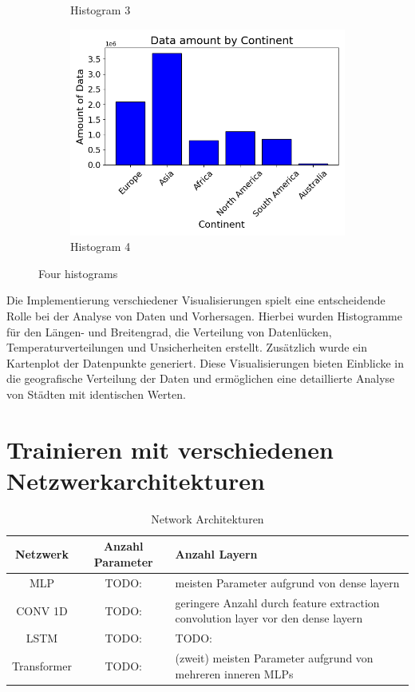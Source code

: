\documentclass[manuscript,screen,review]{acmart}
\begin{document}
\begin{figure}[htp]
\begin{subfigure}{.45\textwidth}
      \caption{Histogram 3}
      \label{fig:sub3}
  \end{subfigure}%
  \begin{subfigure}{.45\textwidth}
      \centering
      \includegraphics[width=.8\linewidth]{./histograms/Continents}
      \caption{Histogram 4}
      \label{fig:sub4}
  \end{subfigure}
  \caption{Four histograms}
  \label{fig:test}
\end{figure}

Die Implementierung verschiedener Visualisierungen spielt eine entscheidende Rolle bei der Analyse von Daten und Vorhersagen. 
Hierbei wurden Histogramme für den Längen- und Breitengrad, die Verteilung von Datenlücken, Temperaturverteilungen und Unsicherheiten erstellt. 
Zusätzlich wurde ein Kartenplot der Datenpunkte generiert. 
Diese Visualisierungen bieten Einblicke in die geografische Verteilung der Daten und ermöglichen eine detaillierte Analyse von Städten mit identischen Werten.


\section{Trainieren mit verschiedenen Netzwerkarchitekturen}

\begin{table}
  \caption{Network Architekturen}
  \label{tab:freq}
  \begin{tabular}{ccl}
    \toprule
    Netzwerk&Anzahl Parameter&Anzahl Layern\\
    \midrule
    MLP & TODO: & meisten Parameter aufgrund von dense layern\\
    CONV 1D & TODO: & geringere Anzahl durch feature extraction convolution layer vor den dense layern\\
    LSTM & TODO: & TODO:\\
    Transformer & TODO: & (zweit) meisten Parameter aufgrund von mehreren inneren MLPs\\
  \bottomrule
\end{tabular}
\end{table}
\end{document}
